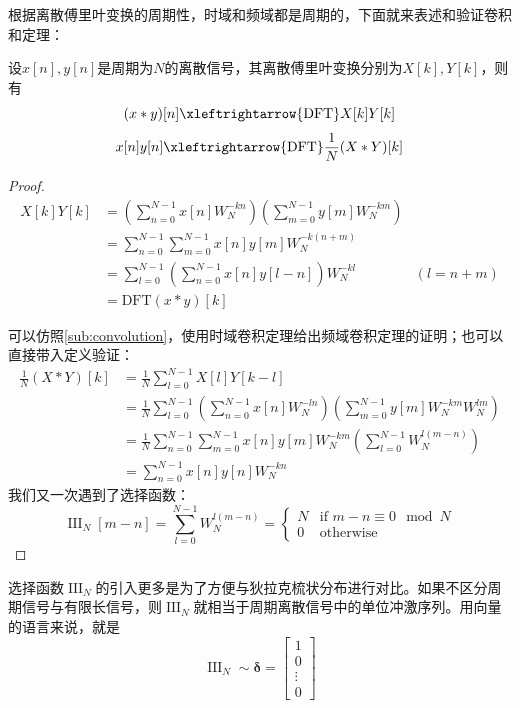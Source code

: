 \documentclass{ctexbook}
\newcommand{\shah}{\operatorname{III}}
\begin{document}
根据离散傅里叶变换的周期性，时域和频域都是周期的，下面就来表述和验证卷积和定理：
\begin{theorem}[离散傅里叶变换的卷积和定理]
    设$x[n],y[n]$是周期为$N$的离散信号，其离散傅里叶变换分别为$X[k],Y[k]$，则有
    \[(x*y)[n]\xleftrightarrow{\text{DFT}}X[k]Y[k]\]
    \[x[n]y[n]\xleftrightarrow{\text{DFT}}\frac{1}{N}(X * Y)[k]\]
\end{theorem}
\begin{proof}
    \begin{align*}
        X[k]Y[k]&=\left(\sum_{n=0}^{N-1}x[n]W_N^{-kn}\right)\left(\sum_{m=0}^{N-1}y[m]W_N^{-km}\right)\\
        &=\sum_{n=0}^{N-1}\sum_{m=0}^{N-1}x[n]y[m]W_N^{-k(n+m)}\\
        &=\sum_{l=0}^{N-1}\left(\sum_{n=0}^{N-1}x[n]y[l-n]\right)W_N^{-kl}&(l=n+m)\\
        &=\text{DFT}(x*y)[k]
    \end{align*}

    可以仿照\ref{sub:convolution}，使用时域卷积定理给出频域卷积定理的证明；也可以直接带入定义验证：
    \begin{align*}
        \frac{1}{N}(X * Y)[k]&=\frac{1}{N}\sum_{l=0}^{N-1}X[l]Y[k-l]\\
        &=\frac{1}{N}\sum_{l=0}^{N-1}\left(\sum_{n=0}^{N-1}x[n]W_N^{-ln}\right)\left(\sum_{m=0}^{N-1}y[m]W_N^{-k m}W_N^{lm}\right)\\
        &=\frac{1}{N}\sum_{n=0}^{N-1}\sum_{m=0}^{N-1}x[n]y[m]W_N^{-k m}\left(\sum_{l=0}^{N-1}W_N^{l(m-n)}\right)\\
        &=\sum_{n=0}^{N-1}x[n]y[n]W_N^{-k n}
    \end{align*}
    我们又一次遇到了选择函数：
    \[\shah_N[m-n]=\sum_{l=0}^{N-1}W_N^{l(m-n)}=\begin{cases}
    N & \text{if } m-n\equiv 0 \mod N \\
    0 & \text{otherwise}
    \end{cases}\]
\end{proof}

选择函数$\shah_N$的引入更多是为了方便与狄拉克梳状分布进行对比。如果不区分周期信号与有限长信号，则$\shah_N$就相当于周期离散信号中的单位冲激序列。用向量的语言来说，就是
\[\shah_N\sim\boldsymbol{\delta}=\begin{bmatrix}
1  \\
0  \\
\vdots \\
0
\end{bmatrix}\]
\end{document}
